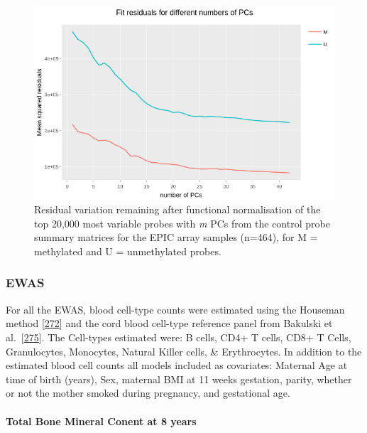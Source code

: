 \documentclass[
]{book}
\begin{document}
\begin{figure}

{\centering \includegraphics[width=0.8\linewidth]{figs/SWSfunnormPCsEPIC} 

}

\caption{Residual variation remaining after functional normalisation of the top 20,000 most variable probes with \emph{m} PCs from the control probe summary matrices for the EPIC array samples (n=464), for M = methylated and U = unmethylated probes.}\label{fig:SWSfunnormPCsEPIC}
\end{figure}



\hypertarget{ewas-1}{%
\subsubsection{EWAS}\label{ewas-1}}

For all the EWAS, blood cell-type counts were estimated using the Houseman method {[}\protect\hyperlink{ref-Houseman2012}{272}{]} and the cord blood cell-type reference panel from Bakulski et al.~{[}\protect\hyperlink{ref-Bakulski2016}{275}{]}.
The Cell-types estimated were: B cells, CD4+ T cells, CD8+ T Cells, Granulocytes, Monocytes, Natural Killer cells, \& Erythrocytes.
In addition to the estimated blood cell counts all models included as covariates: Maternal Age at time of birth (years), Sex, maternal BMI at 11 weeks gestation, parity, whether or not the mother smoked during pregnancy, and gestational age.

\hypertarget{total-bone-mineral-conent-at-8-years}{%
\paragraph{Total Bone Mineral Conent at 8 years}\label{total-bone-mineral-conent-at-8-years}}
\end{document}
